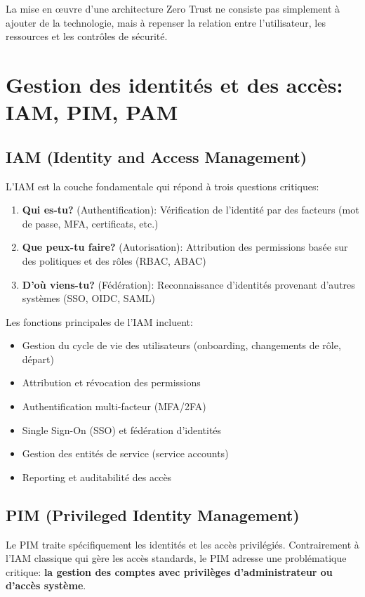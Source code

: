 La mise en œuvre d'une architecture Zero Trust ne consiste pas simplement à ajouter de la technologie, mais à repenser la relation entre l'utilisateur, les ressources et les contrôles de sécurité.

\section{Gestion des identités et des accès: IAM, PIM, PAM}

\subsection{IAM (Identity and Access Management)}

L'IAM est la couche fondamentale qui répond à trois questions critiques:

\begin{enumerate}
    \item \textbf{Qui es-tu?} (Authentification): Vérification de l'identité par des facteurs (mot de passe, MFA, certificats, etc.)
    \item \textbf{Que peux-tu faire?} (Autorisation): Attribution des permissions basée sur des politiques et des rôles (RBAC, ABAC)
    \item \textbf{D'où viens-tu?} (Fédération): Reconnaissance d'identités provenant d'autres systèmes (SSO, OIDC, SAML)
\end{enumerate}

Les fonctions principales de l'IAM incluent:
\begin{itemize}
    \item Gestion du cycle de vie des utilisateurs (onboarding, changements de rôle, départ)
    \item Attribution et révocation des permissions
    \item Authentification multi-facteur (MFA/2FA)
    \item Single Sign-On (SSO) et fédération d'identités
    \item Gestion des entités de service (service accounts)
    \item Reporting et auditabilité des accès
\end{itemize}

\subsection{PIM (Privileged Identity Management)}

Le PIM traite spécifiquement les identités et les accès privilégiés. Contrairement à l'IAM classique qui gère les accès standards, le PIM adresse une problématique critique: \textbf{la gestion des comptes avec privilèges d'administrateur ou d'accès système}.

